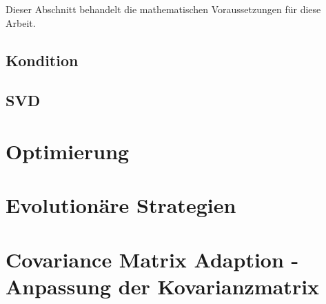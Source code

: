 Dieser Abschnitt behandelt die mathematischen Voraussetzungen für diese Arbeit.
%
\subsection{Kondition}
\label{sec:condition}

%
\subsection{SVD}
\label{sec:svd}

%
\section{Optimierung}
\label{sec:Optimization}

%
\section{Evolutionäre Strategien}
\label{sec:es-common}

%
\section{Covariance Matrix Adaption - Anpassung der Kovarianzmatrix}
\label{sec:cma-es}

%
